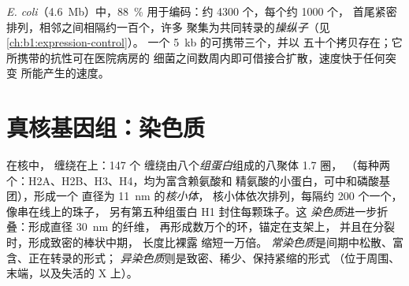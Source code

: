 \begin{example}[紧密排列的基因组]\label{ex:b1:genomes:dense}
\emph{E. coli}（\qty{4.6}{Mb}）中，\qty{88}{\%}
用于编码：约 \num{4300} 个，每个约 \num{1000} 个，
首尾紧密排列，相邻之间相隔约一百个，许多
聚集为共同转录的\emph{操纵子}（见\cref{ch:b1:expression-control}）。
一个 \qty{5}{kb} 的可携带三个，并以
五十个拷贝存在；它所携带的抗性可在医院病房的
细菌之间数周内即可借接合扩散，速度快于任何突变
所能产生的速度。
\end{example}

\section{真核基因组：染色质}

\begin{definition}\label{def:b1:genomes:nucleosome}
在核中， 缠绕在上：\qty{147}{} 个
缠绕由八个\emph{组蛋白}组成的八聚体 1.7 圈，
（每种两个：H2A、H2B、H3、H4，均为富含赖氨酸和
精氨酸的小蛋白，可中和磷酸基团），形成一个
直径为 \qty{11}{nm} 的\emph{核小体}，
核小体依次排列，每隔约 \qty{200}{} 个一个，像串在线上的珠子，
另有第五种组蛋白 H1 封住每颗珠子。这
\emph{染色质}进一步折叠：形成直径 \qty{30}{nm} 的纤维，
再形成数万个的环，锚定在支架上，
并且在分裂时，形成致密的棒状中期，
长度比裸露  缩短一万倍。
\emph{常染色质}是间期中松散、富含、正在转录的形式；
\emph{异染色质}则是致密、稀少、保持紧缩的形式
（位于周围、末端，以及失活的
X 上）。
\end{definition}

